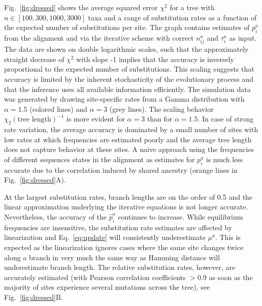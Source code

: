 \documentclass[aps,rmp,twocolumn,linenumbers]{revtex4-1}
\newcommand{\eqp}{p}
\begin{document}
Fig.~\ref{fig:dressed} shows the average squared error $\chi^2$ for a tree with $n\in [100,300,1000,3000]$ taxa and a range of substitution rates as a function of the expected number of substitutions per site.
The graph contains estimates of $\eqp_i^a$ from the alignment and via the iterative scheme with correct $n_{ij}^a$ and $\tau_i^a$ as input.
The data are shown on double logarithmic scales, such that the approximately straight decrease of $\chi^2$ with slope -1 implies that the accuracy is inversely proportional to the expected number of substitutions.
This scaling suggests that accuracy is limited by the inherent stochasticity of the evolutionary process and that the inference uses all available information efficiently.
The simulation data was generated by drawing site-specific rates from a Gamma distribution with $\alpha=1.5$ (colored lines) and $\alpha=3$ (grey lines).
The scaling behavior $\chi_2 (\textrm{tree length})^{-1}$ is more evident for $\alpha=3$ than for $\alpha=1.5$.
In case of strong rate variation, the average accuracy is dominated by a small number of sites with low rates at which frequencies are estimated poorly and the average tree length does not capture behavior at these sites.
A naive approach using the frequencies of different sequences states in the alignment as estimates for $\eqp_i^a$ is much less accurate due to the correlation induced by shared ancestry (orange lines in Fig.~\ref{fig:dressed}A).

At the largest substitution rates, branch lengths are on the order of 0.5 and the linear approximation underlying the iterative equations is not longer accurate.
Nevertheless, the accuracy of the $\hat{\eqp}_i^a$ continues to increase.
While equilibrium frequencies are insensitive, the substitution rate estimates are affected by linearization and Eq.~\ref{eq:update} will consistently underestimate $\mu^a$.
This is expected as the linearization ignores cases where the same site changes twice along a branch in very much the same way as Hamming distance will underestimate branch length.
The relative substitution rates, however, are accurately estimated (with Pearson correlation coefficients $>0.9$ as soon as the majority of sites experience several mutations across the tree), see Fig.~\ref{fig:dressed}B.
\end{document}
